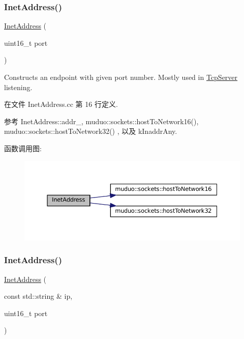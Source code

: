 \subsubsection{\texorpdfstring{Inet\+Address()}{InetAddress()}\hspace{0.1cm}{\footnotesize\ttfamily [1/3]}}
{\footnotesize\ttfamily \hyperlink{classmuduo_1_1InetAddress}{Inet\+Address} (\begin{DoxyParamCaption}\item[{uint16\+\_\+t}]{port }\end{DoxyParamCaption})\hspace{0.3cm}{\ttfamily [explicit]}}

Constructs an endpoint with given port number. Mostly used in \hyperlink{classmuduo_1_1TcpServer}{Tcp\+Server} listening. 

在文件 Inet\+Address.\+cc 第 16 行定义.



参考 Inet\+Address\+::addr\+\_\+, muduo\+::sockets\+::host\+To\+Network16(), muduo\+::sockets\+::host\+To\+Network32() , 以及 k\+Inaddr\+Any.

函数调用图\+:
\nopagebreak
\begin{figure}[H]
\begin{center}
\leavevmode
\includegraphics[width=350pt]{classmuduo_1_1InetAddress_a292e10332bd93f9262a79103d270fc54_cgraph}
\end{center}
\end{figure}
\mbox{\label{classmuduo_1_1InetAddress_ad4031243c174a53e1d2ff57e97f8226b}} 
\subsubsection{\texorpdfstring{Inet\+Address()}{InetAddress()}\hspace{0.1cm}{\footnotesize\ttfamily [2/3]}}
{\footnotesize\ttfamily \hyperlink{classmuduo_1_1InetAddress}{Inet\+Address} (\begin{DoxyParamCaption}\item[{const std\+::string \&}]{ip,  }\item[{uint16\+\_\+t}]{port }\end{DoxyParamCaption})}

